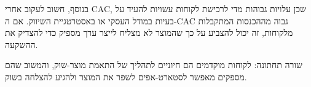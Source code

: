 בנוסף, חשוב לעקוב אחרי CAC, שכן עלויות גבוהות מדי לרכישת לקוחות עשויות להעיד על בעיות במודל העסקי או באסטרטגיית השיווק. אם ה-CAC גבוה מההכנסות המתקבלות מלקוחות, זה יכול להצביע על כך שהמוצר לא מצליח לייצר ערך מספיק כדי להצדיק את ההשקעה.

\begin{takeaway}
שורה תחתונה: לקוחות מוקדמים הם חיוניים לתהליך של התאמת מוצר-שוק, והמשוב שהם מספקים מאפשר לסטארט-אפים לשפר את המוצר ולהגיע להצלחה בשוק.
\end{takeaway}
